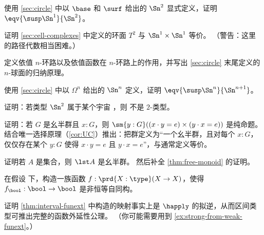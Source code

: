 \begin{ex}\label{ex:suspS1}
  使用 \cref{sec:circle} 中以 $\base$ 和 $\surf$ 给出的 $\Sn^2$ 显式定义，证明 $\eqv{\susp \Sn^1}{\Sn^2}$。
\end{ex}

\begin{ex}\label{ex:torus-s1-times-s1}
  证明 \cref{sec:cell-complexes} 中定义的环面 $T^2$ 与 $\Sn^1\times \Sn^1$ 等价。
  （警告：这里的路径代数相当困难。）
\end{ex}

\begin{ex}\label{ex:nspheres}
  定义依值 $n$-环路以及依值函数在 $n$-环路上的作用，并写出 \cref{sec:circle} 末尾定义的 $n$-球面的归纳原理。
\end{ex}

\begin{ex}\label{ex:susp-spheres-equiv}
  使用 \cref{sec:circle} 中以 $\Omega^n$ 给出的 $\Sn^n$ 定义，证明 $\eqv{\susp \Sn^n}{\Sn^{n+1}}$。
\end{ex}

\begin{ex}\label{ex:spheres-make-U-not-2-type}
  证明：若类型 $\Sn^2$ 属于某个宇宙 \type，则 \type 不是 $2$-类型。
\end{ex}

\begin{ex}\label{ex:monoid-eq-prop}
  证明：若 $G$ 是幺半群且 $x:G$，则 $\sm{y:G}((x\cdot y = e) \times (y\cdot x =e))$ 是纯命题。
  结合唯一选择原理（\cref{cor:UC}）推出：把群定义为“一个幺半群，且对每个 $x:G$，仅仅存在某个 $y:G$ 使得 $x\cdot y = e$ 且 $y\cdot x=e$”，与通常定义等价。
\end{ex}

\begin{ex}\label{ex:free-monoid}
  证明若 $A$ 是集合，则 $\lst A$ 是幺半群。
  然后补全 \cref{thm:free-monoid} 的证明。
\end{ex}

\begin{ex}\label{ex:unnatural-endomorphisms}
  在假设 \LEM{} 下，构造一族函数 $f:\prd{X:\type}(X\to X)$，使得 $f_\bool:\bool\to\bool$ 是非恒等自同构。
\end{ex}

\begin{ex}\label{ex:funext-from-interval}
  证明 \cref{thm:interval-funext} 中构造的映射事实上是 $\happly$ 的拟逆，从而区间类型可推出完整的函数外延性公理。
  （你可能需要用到 \cref{ex:strong-from-weak-funext}。）
\end{ex}

